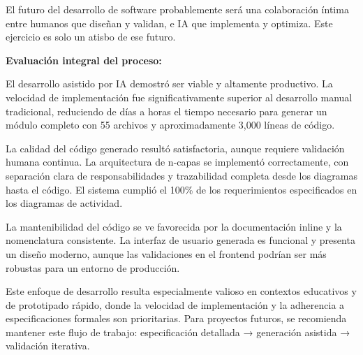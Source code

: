 \documentclass[11pt,a4paper]{article}
\begin{document}
El futuro del desarrollo de software probablemente será una colaboración íntima entre humanos que diseñan y validan, e IA que implementa y optimiza. Este ejercicio es solo un atisbo de ese futuro.

\textbf{Evaluación integral del proceso:}

El desarrollo asistido por IA demostró ser viable y altamente productivo. La velocidad de implementación fue significativamente superior al desarrollo manual tradicional, reduciendo de días a horas el tiempo necesario para generar un módulo completo con 55 archivos y aproximadamente 3,000 líneas de código.

La calidad del código generado resultó satisfactoria, aunque requiere validación humana continua. La arquitectura de n-capas se implementó correctamente, con separación clara de responsabilidades y trazabilidad completa desde los diagramas hasta el código. El sistema cumplió el 100\% de los requerimientos especificados en los diagramas de actividad.

La mantenibilidad del código se ve favorecida por la documentación inline y la nomenclatura consistente. La interfaz de usuario generada es funcional y presenta un diseño moderno, aunque las validaciones en el frontend podrían ser más robustas para un entorno de producción.

Este enfoque de desarrollo resulta especialmente valioso en contextos educativos y de prototipado rápido, donde la velocidad de implementación y la adherencia a especificaciones formales son prioritarias. Para proyectos futuros, se recomienda mantener este flujo de trabajo: especificación detallada → generación asistida → validación iterativa.

\newpage

\printbibliography[title={Referencias}]
\end{document}
